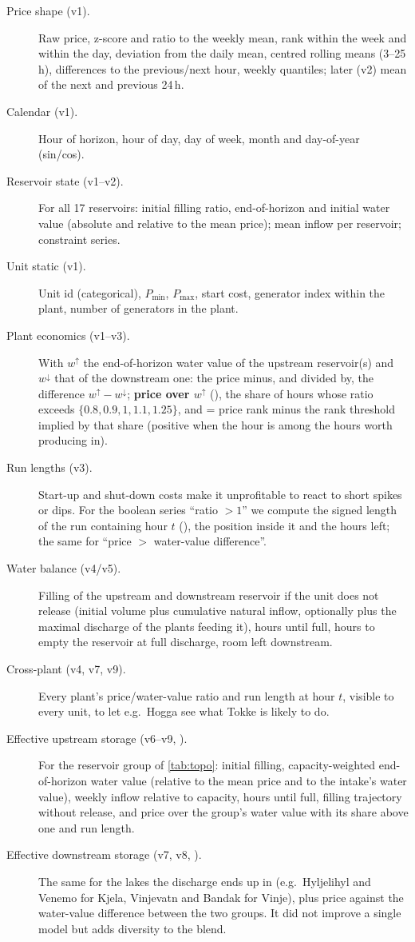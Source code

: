 \documentclass[11pt,a4paper]{article}
\newcommand{\code}[1]{\texttt{\detokenize{#1}}}
\begin{document}
\begin{description}
  \item[Price shape (v1).] Raw price, z-score and ratio to the weekly mean, rank within the week and within the
  day, deviation from the daily mean, centred rolling means (3--25\,h), differences to the previous/next hour,
  weekly quantiles; later (v2) mean of the next and previous 24\,h.
  \item[Calendar (v1).] Hour of horizon, hour of day, day of week, month and day-of-year (sin/cos).
  \item[Reservoir state (v1--v2).] For all 17 reservoirs: initial filling ratio, end-of-horizon and initial
  water value (absolute and relative to the mean price); mean inflow per reservoir; constraint series.
  \item[Unit static (v1).] Unit id (categorical), $P_{\min}$, $P_{\max}$, start cost, generator index within
  the plant, number of generators in the plant.
  \item[Plant economics (v1--v3).] With $w^{\uparrow}$ the end-of-horizon water value of the upstream
  reservoir(s) and $w^{\downarrow}$ that of the downstream one: the price minus, and divided by,
  the difference $w^{\uparrow}-w^{\downarrow}$;
  \textbf{price over $w^{\uparrow}$} (\code{p_over_upwv}), the share of hours whose ratio exceeds
  $\{0.8, 0.9, 1, 1.1, 1.25\}$, and \code{rank_m_need_up} = price rank minus the rank threshold implied by that
  share (positive when the hour is among the hours worth producing in).
  \item[Run lengths (v3).] Start-up and shut-down costs make it unprofitable to react to short spikes or dips.
  For the boolean series ``ratio $>1$'' we compute the signed length of the run containing hour $t$
  (\code{seg_up_len}), the position inside it and the hours left; the same for ``price $>$ water-value
  difference''.
  \item[Water balance (v4/v5).] Filling of the upstream and downstream reservoir if the unit does not release
  (initial volume plus cumulative natural inflow, optionally plus the maximal discharge of the plants feeding
  it), hours until full, hours to empty the reservoir at full discharge, room left downstream.
  \item[Cross-plant (v4, v7, v9).] Every plant's price/water-value ratio and run length at hour $t$, visible to
  every unit, to let e.g.\ Hogga see what Tokke is likely to do.
  \item[Effective upstream storage (v6--v9, \code{--topo2}).] For the reservoir group of \cref{tab:topo}:
  initial filling, capacity-weighted end-of-horizon water value (relative to the mean price and to the intake's
  water value), weekly inflow relative to capacity, hours until full, filling trajectory without release, and
  price over the group's water value with its share above one and run length.
  \item[Effective downstream storage (v7, v8, \code{--dn2}).] The same for the lakes the discharge ends up in
  (e.g.\ Hyljelihyl and Venemo for Kjela, Vinjevatn and Bandak for Vinje), plus price against the water-value
  difference between the two groups. It did not improve a single model but adds diversity to the blend.
\end{description}
\end{document}
